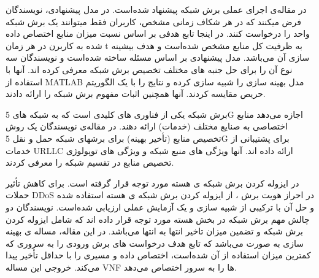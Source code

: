 در مقاله‌ی 
\cite{onet}
اجرای عملی برش شبکه پیشنهاد شده‌است.
در مدل پیشنهادی، نویسندگان فرض میکنند که در هر شکاف زمانی مشخص، کاربران فقط میتوانند یک برش شبکه واحد را درخواست کنند.
در اینجا تابع هدفی بر اساس نسبت میزان منابع اختصاص داده شده به کاربرن در هر زمان t به ظرفیت کل منابع مشخص شده‌است و هدف بیشینه سازی آن  می‌باشد.  
مدل پیشنهادی بر اساس مسئله  ساخته شده‌است و نویسندگان سه نوع  آن را برای حل جنبه های مختلف تخصیص برش شبکه معرفی کرده اند.
آنها با استفاده از MATLAB مدل بهینه سازی را شبیه سازی کرده و نتایج را با یک الگوریتم حریص مقایسه کردند. آنها همچنین اثبات مفهوم برش شبکه را ارائه دادند.

برش شبکه یکی از فناوری های کلیدی است که به شبکه های 5G اجازه می‌دهد منابع اختصاصی به صنایع مختلف (خدمات) ارائه دهند.
در مقاله‌ی
\cite{li2019latency}
نویسندگان یک روش تخصیص منابع (تأخیر بهینه) برای برشهای شبکه حمل و نقل 5G برای پشتیبانی از خدمات URLLC ارائه داده اند.
آنها ویژگی های منبع شبکه و ویژگی های توپولوژی تخصیص منابع در تقسیم شبکه را معرفی کردند.

در 
\citep{vnf1,coreSlice}
ایزوله کردن برش شبکه ی هسته 
مورد توجه قرار گرفته است.
\citep{vnf1}
برای کاهش تأثیر حملات DDoS در احراز هویت برش ، از ایزوله کردن برش شبکه ی هسته استفاده شده و حل آن با ترکیبی از شبیه سازی و یک آزمایش عملی ارزیابی شده‌است.
نویسندگان
\citep{coreSlice}
دو چالش مهم برش شبکه در بخش هسته مورد توجه قرار داده اند که شامل ایزوله کردن برش شبکه و تضمین میزان تاخیر انتها به انتها می‌باشد.
در این مقاله، مساله ی بهینه سازی به صورت 
 می‌باشد که
 تابع هدف درخواست های برش ورودی را به سروری که کمترین میزان استفاده از آن شده‌است، اختصاص داده و مسیری را با حداقل تأخیر پیدا می‌کند. خروجی این مساله VNF ها را به سرور اختصاص می‌دهد.  

